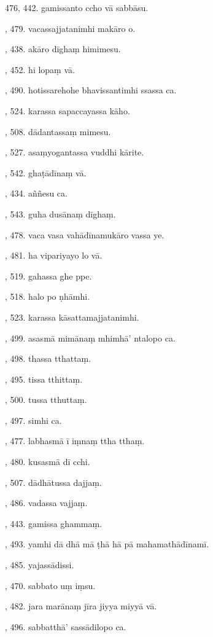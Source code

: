 476, 442. gamissanto ccho vā sabbāsu.\par {}, 479. vacassajjatanimhi makāro o.\par {}, 438. akāro dīghaṃ himimesu.\par {}, 452. hi lopaṃ vā.\par {}, 490. hotissarehohe bhavissantimhi ssassa ca.\par {}, 524. karassa sapaccayassa kāho.\par {}, 508. dādantassaṃ mimesu.\par {}, 527. asaṃyogantassa vuddhi kārite.\par {}, 542. ghaṭādīnaṃ vā.\par {}, 434. aññesu ca.\par {}, 543. guha dusānaṃ dīghaṃ.\par {}, 478. vaca vasa vahādīnamukāro vassa ye.\par {}, 481. ha vipariyayo lo vā.\par {}, 519. gahassa ghe ppe.\par {}, 518. halo po ṇhāmhi.\par {}, 523. karassa kāsattamajjatanimhi.\par {}, 499. asasmā mimānaṃ mhimhā’ ntalopo ca.\par {}, 498. thassa tthattaṃ.\par {}, 495. tissa tthittaṃ.\par {}, 500. tussa tthuttaṃ.\par {}, 497. simhi ca.\par {}, 477. labhasmā ī iṃnaṃ ttha tthaṃ.\par {}, 480. kusasmā dī cchi.\par {}, 507. dādhātussa dajjaṃ.\par {}, 486. vadassa vajjaṃ.\par {}, 443. gamissa ghammaṃ.\par {}, 493. yamhi dā dhā mā ṭhā hā pā mahamathādīnamī.\par {}, 485. yajassādissi.\par {}, 470. sabbato uṃ iṃsu.\par {}, 482. jara marānaṃ jīra jiyya miyyā vā.\par {}, 496. sabbatthā’ sassādilopo ca.\par \noindent
